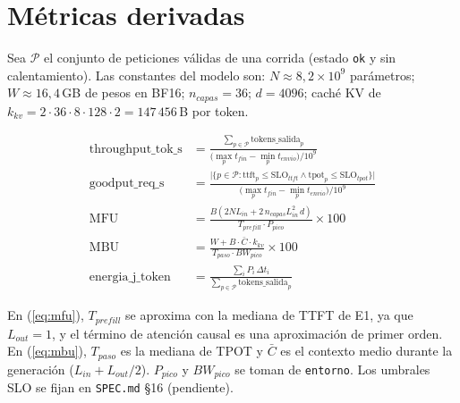 \documentclass[11pt,a4paper]{article}
\begin{document}
\section{Métricas derivadas}
Sea $\mathcal{P}$ el conjunto de peticiones válidas de una corrida (estado \texttt{ok} y sin calentamiento). Las constantes del modelo son: $N \approx 8{,}2\times10^{9}$ parámetros; $W \approx 16{,}4$\,GB de pesos en BF16; $n_{capas}=36$; $d=4096$; caché KV de $k_{kv} = 2\cdot36\cdot8\cdot128\cdot2 = 147\,456$\,B por token.

\begin{align}
\text{throughput\_tok\_s} &= \frac{\sum_{p\in\mathcal{P}} \text{tokens\_salida}_p}{\bigl(\max_p t_{fin} - \min_p t_{envio}\bigr)/10^{9}} \label{eq:thr}\\[4pt]
\text{goodput\_req\_s} &= \frac{\bigl|\{p\in\mathcal{P} : \text{ttft}_p \le \text{SLO}_{ttft} \wedge \text{tpot}_p \le \text{SLO}_{tpot}\}\bigr|}{\bigl(\max_p t_{fin} - \min_p t_{envio}\bigr)/10^{9}} \label{eq:good}\\[4pt]
\text{MFU} &= \frac{B\left(2N L_{in} + 2\, n_{capas} L_{in}^{2}\, d\right)}{T_{prefill}\cdot P_{pico}} \times 100 \label{eq:mfu}\\[4pt]
\text{MBU} &= \frac{W + B\cdot \bar{C}\cdot k_{kv}}{T_{paso}\cdot BW_{pico}} \times 100 \label{eq:mbu}\\[4pt]
\text{energia\_j\_token} &= \frac{\sum_{i} P_i\,\Delta t_i}{\sum_{p\in\mathcal{P}} \text{tokens\_salida}_p} \label{eq:energia}
\end{align}

En (\ref{eq:mfu}), $T_{prefill}$ se aproxima con la mediana de TTFT de E1, ya que $L_{out}=1$, y el término de atención causal es una aproximación de primer orden. En (\ref{eq:mbu}), $T_{paso}$ es la mediana de TPOT y $\bar{C}$ es el contexto medio durante la generación ($L_{in} + L_{out}/2$). $P_{pico}$ y $BW_{pico}$ se toman de \texttt{entorno}. Los umbrales SLO se fijan en \texttt{SPEC.md} §16 (pendiente).

\end{document}
